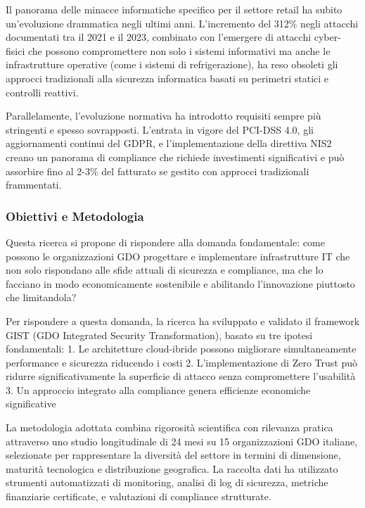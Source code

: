 \documentclass{report}
\begin{document}
Il panorama delle minacce informatiche specifico per il settore retail
ha subito un'evoluzione drammatica negli ultimi anni. L'incremento del
312\% negli attacchi documentati tra il 2021 e il 2023, combinato con
l'emergere di attacchi cyber-fisici che possono compromettere non solo i
sistemi informativi ma anche le infrastrutture operative (come i sistemi
di refrigerazione), ha reso obsoleti gli approcci tradizionali alla
sicurezza informatica basati su perimetri statici e controlli reattivi.

Parallelamente, l'evoluzione normativa ha introdotto requisiti sempre
più stringenti e spesso sovrapposti. L'entrata in vigore del PCI-DSS
4.0, gli aggiornamenti continui del GDPR, e l'implementazione della
direttiva NIS2 creano un panorama di compliance che richiede
investimenti significativi e può assorbire fino al 2-3\% del fatturato
se gestito con approcci tradizionali frammentati.

\subsubsection{Obiettivi e Metodologia}\label{obiettivi-e-metodologia}

Questa ricerca si propone di rispondere alla domanda fondamentale: come
possono le organizzazioni GDO progettare e implementare infrastrutture
IT che non solo rispondano alle sfide attuali di sicurezza e compliance,
ma che lo facciano in modo economicamente sostenibile e abilitando
l'innovazione piuttosto che limitandola?

Per rispondere a questa domanda, la ricerca ha sviluppato e validato il
framework GIST (GDO Integrated Security Transformation), basato su tre
ipotesi fondamentali: 1. Le architetture cloud-ibride possono migliorare
simultaneamente performance e sicurezza riducendo i costi 2.
L'implementazione di Zero Trust può ridurre significativamente la
superficie di attacco senza compromettere l'usabilità 3. Un approccio
integrato alla compliance genera efficienze economiche significative

La metodologia adottata combina rigorosità scientifica con rilevanza
pratica attraverso uno studio longitudinale di 24 mesi su 15
organizzazioni GDO italiane, selezionate per rappresentare la diversità
del settore in termini di dimensione, maturità tecnologica e
distribuzione geografica. La raccolta dati ha utilizzato strumenti
automatizzati di monitoring, analisi di log di sicurezza, metriche
finanziarie certificate, e valutazioni di compliance strutturate.
\end{document}
